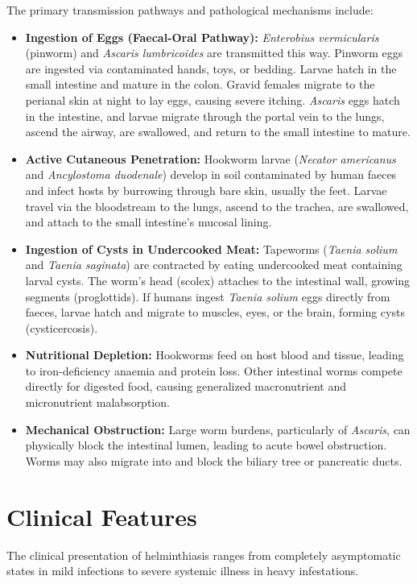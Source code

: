 The primary transmission pathways and pathological mechanisms include:
\begin{itemize}
    \item \textbf{Ingestion of Eggs (Faecal-Oral Pathway):} \textit{Enterobius vermicularis} (pinworm) and \textit{Ascaris lumbricoides} are transmitted this way. Pinworm eggs are ingested via contaminated hands, toys, or bedding. Larvae hatch in the small intestine and mature in the colon. Gravid females migrate to the perianal skin at night to lay eggs, causing severe itching. \textit{Ascaris} eggs hatch in the intestine, and larvae migrate through the portal vein to the lungs, ascend the airway, are swallowed, and return to the small intestine to mature.
    \item \textbf{Active Cutaneous Penetration:} Hookworm larvae (\textit{Necator americanus} and \textit{Ancylostoma duodenale}) develop in soil contaminated by human faeces and infect hosts by burrowing through bare skin, usually the feet. Larvae travel via the bloodstream to the lungs, ascend to the trachea, are swallowed, and attach to the small intestine's mucosal lining.
    \item \textbf{Ingestion of Cysts in Undercooked Meat:} Tapeworms (\textit{Taenia solium} and \textit{Taenia saginata}) are contracted by eating undercooked meat containing larval cysts. The worm's head (scolex) attaches to the intestinal wall, growing segments (proglottids). If humans ingest \textit{Taenia solium} eggs directly from faeces, larvae hatch and migrate to muscles, eyes, or the brain, forming cysts (cysticercosis).
    \item \textbf{Nutritional Depletion:} Hookworms feed on host blood and tissue, leading to iron-deficiency anaemia and protein loss. Other intestinal worms compete directly for digested food, causing generalized macronutrient and micronutrient malabsorption.
    \item \textbf{Mechanical Obstruction:} Large worm burdens, particularly of \textit{Ascaris}, can physically block the intestinal lumen, leading to acute bowel obstruction. Worms may also migrate into and block the biliary tree or pancreatic ducts.
\end{itemize}

\section*{Clinical Features}
The clinical presentation of helminthiasis ranges from completely asymptomatic states in mild infections to severe systemic illness in heavy infestations.

